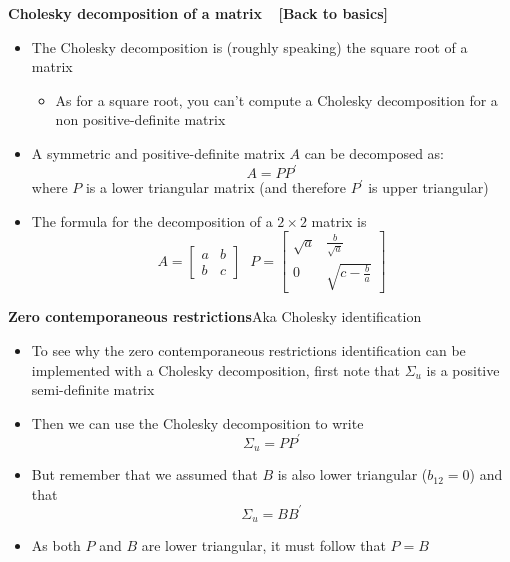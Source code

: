 \documentclass[10pt,english,t,aspectratio=169,ignorenonframetext]{beamer}
\begin{document}
\begin{frame}
{\color{note} \textbf{Cholesky decomposition of a matrix} \ {\footnotesize 
\textbf{[Back to basics]}}}\bigskip

\begin{itemize}
\item The Cholesky decomposition is (roughly speaking) the square root of a
matrix\smallskip

\begin{itemize}
\item As for a square root, you can't compute a Cholesky decomposition for a
non positive-definite matrix\bigskip
\end{itemize}

\item A symmetric and positive-definite matrix $A$ can be decomposed as:%
\begin{equation*}
A=PP^{\prime }
\end{equation*}%
where $P$ is a lower triangular matrix (and therefore $P^{\prime }$ is upper
triangular)\bigskip

\item The formula for the decomposition of a $2\times 2$ matrix is%
\begin{equation*}
A=%
\begin{bmatrix}
a & b \\ 
b & c%
\end{bmatrix}%
\ \ \ P=%
\begin{bmatrix}
\sqrt{a} & \frac{b}{\sqrt{a}} \\ 
0 & \sqrt{c-\frac{b}{a}}%
\end{bmatrix}%
\end{equation*}
\end{itemize}
\end{frame}


\begin{frame}
{\textbf{Zero contemporaneous restrictions}}{Aka Cholesky identification}\smallskip

\begin{itemize}
\item To see why the zero contemporaneous restrictions identification can be
implemented with a Cholesky decomposition, first note that $\Sigma _{u}$ is
a positive semi-definite matrix\bigskip

\item Then we can use the Cholesky decomposition to write 
\begin{equation*}
\Sigma _{u}=PP^{\prime }
\end{equation*}%
\pause

\item But remember that we assumed that $B$ is also lower triangular ($%
b_{12}=0$) and that%
\begin{equation*}
\Sigma _{u}=BB^{\prime }
\end{equation*}%
\pause

\item As both $P$ and $B$ are lower triangular, it must follow that $P=B$
\end{itemize}
\end{frame}
\end{document}
